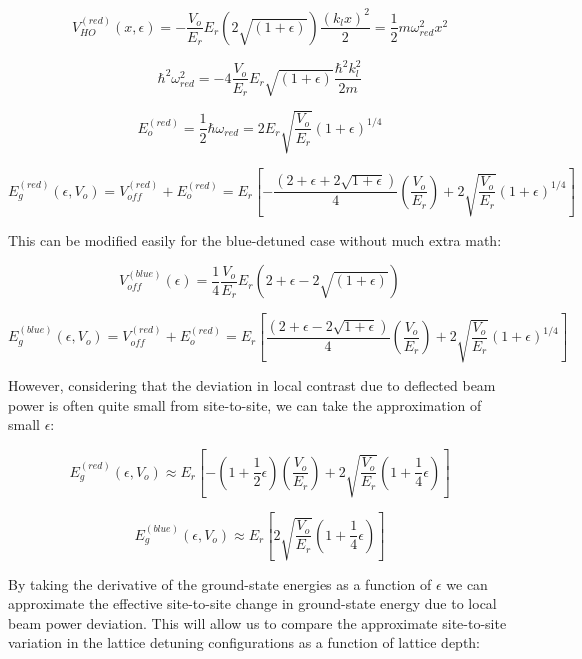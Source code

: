 \[
V_{HO}^{(red)}(x,\epsilon) = - \frac{V_o}{E_r}E_r ( 2 \sqrt{(1+\epsilon)}) \frac{(k_l x)^2}{2} = \frac{1}{2} m \omega_{red}^2 x^2
\]

\[
\hbar^2 \omega_{red}^2 = - 4 \frac{V_o}{E_r} E_r  \sqrt{(1+\epsilon)} \frac{\hbar^2 k_l^2}{2 m}
\]

\[
E_o^{(red)} = \frac{1}{2}\hbar \omega_{red} = 2 E_r \sqrt{\frac{V_o}{E_r}} (1+\epsilon)^{1/4}
\]

\begin{equation}
E_g^{(red)} (\epsilon, V_o) = V_{off}^{(red)} + E_o^{(red)} = E_r \left [ - \frac{(2+\epsilon+2\sqrt{1+\epsilon})}{4} \left( \frac{V_o}{E_r} \right ) + 2 \sqrt{\frac{V_o}{E_r}}(1+\epsilon)^{1/4} \right ]
\label{eqn:red}
\end{equation}


This can be modified easily for the blue-detuned case without much extra math:

\[
V_{off} ^{(blue)}(\epsilon) = \frac{1}{4} \frac{V_o}{E_r} E_r \left ( 2 + \epsilon - 2 \sqrt{(1+\epsilon)} \right )
\]

\begin{equation}
E_g^{(blue)} (\epsilon, V_o) = V_{off}^{(red)} + E_o^{(red)} = E_r \left [ \frac{(2+\epsilon-2\sqrt{1+\epsilon})}{4} \left( \frac{V_o}{E_r} \right ) + 2 \sqrt{\frac{V_o}{E_r}}(1+\epsilon)^{1/4} \right ]
\label{eqn:red}
\end{equation}

However, considering that the deviation in local contrast due to deflected beam power is often quite small from site-to-site, we can take the approximation of small $\epsilon$:

\begin{equation}
E_g^{(red)}(\epsilon, V_o) \approx  E_r \left [ - \left (1+\frac{1}{2}\epsilon \right) \left ( \frac{V_o}{E_r} \right ) + 2 \sqrt{\frac{V_o}{E_r}}\left (1+\frac{1}{4}\epsilon \right ) \right ]
\end{equation}

\begin{equation}
E_g^{(blue)}(\epsilon, V_o) \approx  E_r \left [2 \sqrt{\frac{V_o}{E_r}}\left (1+\frac{1}{4}\epsilon \right ) \right ]
\end{equation}

By taking the derivative of the ground-state energies as a function of $\epsilon$ we can approximate the effective site-to-site change in ground-state energy due to local beam power deviation. This will allow us to compare the approximate site-to-site variation in the lattice detuning configurations as a function of lattice depth:

